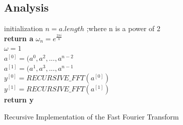 \documentclass{article}
\begin{document}
\subsection{Analysis} \cite{Cormen:2001:IA:580470}
\begin{algorithm}[H]
 initialization\;
 $n=a.length$ ;where n is a power of 2  \\
  {
 	\textbf{return a}
 }{
 	$\omega_{n}=e^{\frac{2\pi i}{n}}$ \\
 	$\omega=1$ \\
 	$a^{[0]}=(a^{0},a^{2},...,a^{n-2}$ \\
 	$a^{[1]}=(a^{1},a^{3},...,a^{n-1}$ \\
 	$y^{[0]}=RECURSIVE\_FFT(a^{[0]})$ \\
 	$y^{[1]}=RECURSIVE\_FFT(a^{[1]})$ \\
 	\textbf{return y}
 }
 \caption{Recursive Implementation of the Fast Fourier Transform}
\end{algorithm}
\end{document}
